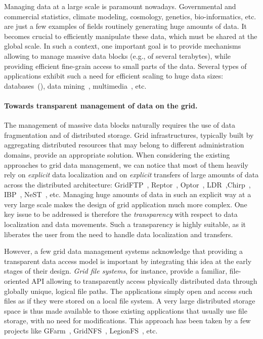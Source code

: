 \documentclass{llncs}
\begin{document}
Managing data at a large scale is paramount nowadays. Governmental and
commercial statistics, climate modeling, cosmology, genetics, 
bio-informatics, etc.  are just a few examples 
of fields routinely generating huge amounts of data. It becomes crucial to 
efficiently manipulate these data, which must be shared at the global scale.
In such a context, one important goal is to provide mechanisms
allowing to manage massive data blocks (e.g., of several terabytes),
while providing efficient fine-grain access to small parts of the
data. Several types of applications exhibit such a need for efficient
scaling to huge data sizes:
databases~(\cite{DouDou03PostgreSQL,Tho98Concurrency,NicJar00IEEE}), data
mining~\cite{JinYan05DataMining}, multimedia~\cite{casKur07Multimedia}, etc.



\paragraph {Towards transparent management of data on the grid. }

The management of massive data blocks naturally requires the use of
data fragmentation and of distributed storage. 
Grid infrastructures, typically built by aggregating distributed
resources that may belong to different administration domains, 
provide an appropriate solution. When considering the existing
approaches to grid data management, we can notice that most of them
heavily rely on \emph{explicit} data localization and on
\emph{explicit} transfers of large amounts of data across the
distributed architecture: GridFTP~\cite{AllBesBreetal02},
Reptor~\cite{KunLauStoSto05FGCS}, Optor~\cite{KunLauStoSto05FGCS},
LDR~\cite{ldr},Chirp~\cite{Chirp}, IBP~\cite{BasBecFagetal02IBP}, NeST~\cite{BenVenLeRetal02},
etc. Managing huge amounts of data in such an explicit way at a very
large scale makes  the design of grid application much more complex.  One
key issue to be addressed is therefore the \emph{transparency} with
respect to data localization and data movements. Such a transparency
is highly suitable, as it liberates the user from the need to handle
data localization and transfers.



However, a few grid data management systems acknowledge that providing a
transparent data access model is important by integrating this idea at
the early stages of their design. 
\emph{Grid file systems}, for instance, provide a
familiar, file-oriented API allowing to transparently access
physically distributed data through globally unique, logical file
paths. The applications simply open and access such files as if they
were stored on a local file system. A very large distributed storage
space is thus made available to those existing applications that usually use
file storage, with no need for modifications. This approach has been
taken by a few projects like GFarm~\cite{TatMorMatetal02Gfarm},
GridNFS~\cite{HonAdaKee05GridNFS}, LegionFS~\cite{WhiWalHumGri01LegionFS}, etc. 
\end{document}
